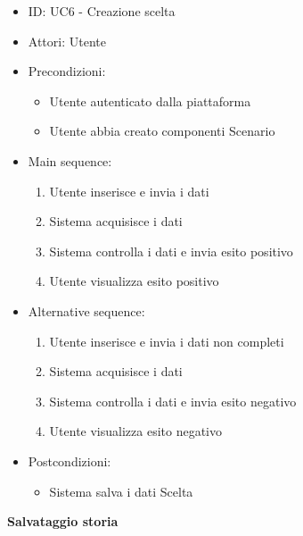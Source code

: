 \documentclass{article}
\begin{document}
\begin{itemize}[label = { }]
    \itemsep0px
    \item ID: UC6 - Creazione scelta
    \item Attori: Utente
    \item Precondizioni: 
        \begin{itemize}[label = {-}]
            \item Utente autenticato dalla piattaforma
            \item Utente abbia creato componenti Scenario
        \end{itemize}
    \item Main sequence: 
        \begin{enumerate}
            \item Utente inserisce e invia i dati
            \item Sistema acquisisce i dati
            \item Sistema controlla i dati e invia esito positivo
            \item Utente visualizza esito positivo
        \end{enumerate}
    \item Alternative sequence:
        \begin{enumerate}
            \item Utente inserisce e invia i dati non completi
            \item Sistema acquisisce i dati
            \item Sistema controlla i dati e invia esito negativo
            \item Utente visualizza esito negativo
        \end{enumerate}
    \item Postcondizioni: 
        \begin{itemize}[label = {-}]
            \item Sistema salva i dati Scelta
        \end{itemize}
\end{itemize}
\textbf{Salvataggio storia}
\end{document}
